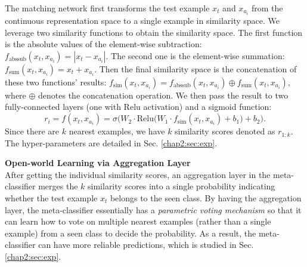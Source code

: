 The matching network first transforms the test example $x_t$ and $x_{a_{i}}$ from the continuous representation space to a single example in similarity space.
We leverage two similarity functions to obtain the similarity space.
The first function is the absolute values of the element-wise subtraction:
$f_\text{abssub}(x_t, x_{a_{i}})=|x_t - x_{a_{i}}|$.
The second one is the element-wise summation:
$f_\text{sum}(x_t, x_{a_{i}})=x_t + x_{a_{i}}$.
Then the final similarity space is the concatenation of these two functions' results:
$f_\text{sim}(x_t, x_{a_{i}})=f_\text{abssub}(x_t, x_{a_{i}}) \oplus f_\text{sum}(x_t, x_{a_{i}})$, where $\oplus$ denotes the concatenation operation.
We then pass the result to two fully-connected layers (one with Relu activation) and a sigmoid function: 
\begin{equation}
\label{chap2:eq:r}
r_i=f(x_t, x_{a_i} )=\sigma\Big(W_2\cdot\text{Relu}\big(W_1\cdot f_\text{sim}(x_t, x_{a_i} ) +b_1\big)+b_2\Big).
\end{equation}
Since there are $k$ nearest examples, we have $k$ similarity scores denoted as $r_{1:k}$.
The hyper-parameters are detailed in Sec. \ref{chap2:sec:exp}.

\textbf{Open-world Learning via Aggregation Layer}\\
\label{chap2:sec:agg}
After getting the individual similarity scores, an aggregation layer in the meta-classifier merges the $k$ similarity scores into a single probability indicating whether the test example $x_t$ belongs to the seen class.
By having the aggregation layer, the meta-classifier essentially has a \textit{parametric voting mechanism} so that it can learn how to vote on multiple nearest examples (rather than a single example) from a seen class to decide the probability.
As a result, the meta-classifier can have more reliable predictions, which is studied in Sec. \ref{chap2:sec:exp}.

